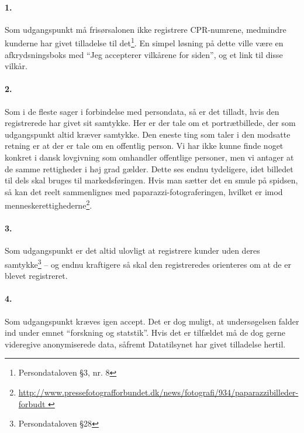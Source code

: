 



\maketitle

\tableofcontents

\thispagestyle{empty}

\paragraph{1.} Som udgangspunkt må frisørsalonen ikke registrere CPR-numrene,
medmindre kunderne har givet tilladelse til det\footnote{Persondataloven §3, nr.
8}. En simpel løsning på dette ville være en afkrydsningsboks med ``Jeg
accepterer vilkårene for siden'', og et link til disse vilkår.

\paragraph{2.} Som i de fleste sager i forbindelse med persondata, så
er det tilladt, hvis den registrerede har givet sit samtykke. Her er der
tale om et portrætbillede, der som udgangspunkt altid kræver samtykke.
Den eneste ting som taler i den modsatte retning er at der er tale om en
offentlig person. Vi har ikke kunne finde noget konkret i dansk lovgivning
som omhandler offentlige personer, men vi antager at de samme rettigheder i
høj grad gælder. Dette ses endnu tydeligere, idet billedet til dels skal
bruges til markedsføringen. Hvis man sætter det en smule på spidsen, så
kan det reelt sammenlignes med paparazzi-fotograferingen, hvilket er imod
menneskerettighederne\footnote{\url{
    http://www.pressefotografforbundet.dk/news/fotografi/934/paparazzibilleder-forbudt
}}.

\paragraph{3.} Som udgangspunkt er det altid ulovligt at registrere kunder uden
deres samtykke\footnote{Persondataloven §28} -- og endnu kraftigere så skal den
registreredes orienteres om at de er blevet registreret.

\paragraph{4.} Som udgangspunkt kræves igen accept. Det er dog muligt, at
undersøgelsen falder ind under emnet ``forskning og statstik''. Hvis det er
tilfældet må de dog gerne videregive anonymiserede data, såfremt Datatilsynet
har givet tilladelse hertil.

